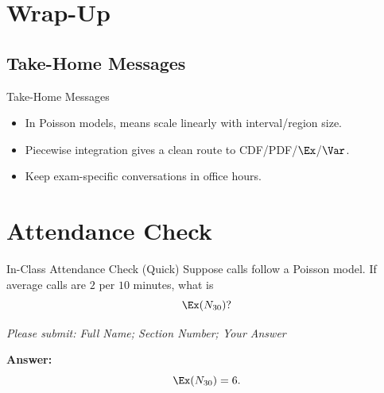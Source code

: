 \documentclass[aspectratio=169]{beamer}
\begin{document}
\section{Wrap-Up}

\subsection{Take-Home Messages}
\begin{frame}{Take-Home Messages}
  \begin{itemize}
    \item In Poisson models, means scale linearly with interval/region size.
    \item Piecewise integration gives a clean route to CDF/PDF/\(\Ex\)/\(\Var\).
    \item Keep exam-specific conversations in office hours.
  \end{itemize}
\end{frame}

\section{Attendance Check}

\begin{frame}{In-Class Attendance Check (Quick)}
  Suppose calls follow a Poisson model.
  If average calls are \(2\) per \(10\) minutes, what is
  \[
    \Ex(N_{30})?
  \]

  \vspace{3mm}
  \textit{Please submit: Full Name; Section Number; Your Answer}

  \pause
  \vspace{2mm}
  \textbf{Answer:}
  \[
    \Ex(N_{30})=6.
  \]
\end{frame}
\end{document}

